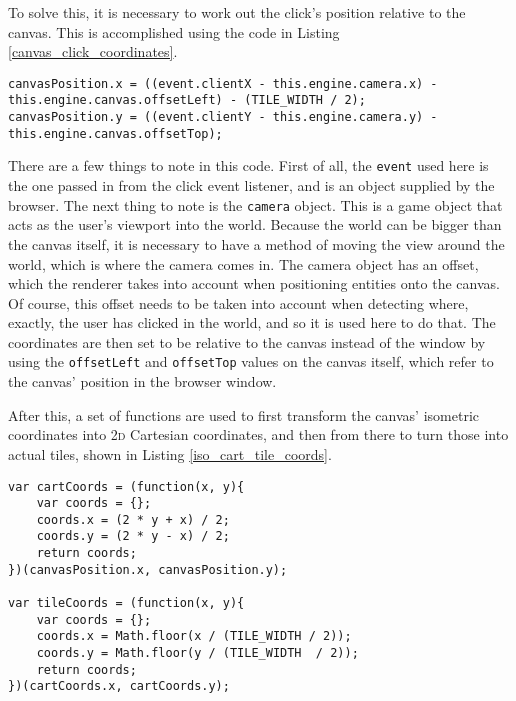 To solve this, it is necessary to work out the click's position relative to the canvas. This is accomplished using the code in Listing \ref{canvas_click_coordinates}.

\noindent
\begin{minipage}{\linewidth}
\begin{lstlisting}[style=js, caption={Transforming a user's click to be relative to the canvas, rather than the window.}, label=canvas_click_coordinates]
canvasPosition.x = ((event.clientX - this.engine.camera.x) - this.engine.canvas.offsetLeft) - (TILE_WIDTH / 2);
canvasPosition.y = ((event.clientY - this.engine.camera.y) - this.engine.canvas.offsetTop);
\end{lstlisting}
\end{minipage}

There are a few things to note in this code. First of all, the \texttt{event} used here is the one passed in from the click event listener, and is an object supplied by the browser. The next thing to note is the \texttt{camera} object. This is a game object that acts as the user's viewport into the world. Because the world can be bigger than the canvas itself, it is necessary to have a method of moving the view around the world, which is where the camera comes in. The camera object has an offset, which the renderer takes into account when positioning entities onto the canvas. Of course, this offset needs to be taken into account when detecting where, exactly, the user has clicked in the world, and so it is used here to do that. The coordinates are then set to be relative to the canvas instead of the window by using the \texttt{offsetLeft} and \texttt{offsetTop} values on the canvas itself, which refer to the canvas' position in the browser window.

After this, a set of functions are used to first transform the canvas' isometric coordinates into \textsc{2d} Cartesian coordinates, and then from there to turn those into actual tiles, shown in Listing \ref{iso_cart_tile_coords}.

\noindent
\begin{minipage}{\linewidth}
\begin{lstlisting}[style=js, caption={Turning the canvas isometric coordinates into \textsc{2d} Cartesian coordinates and then into tile positions. Original algorithm to transform isometric to Cartesian space from \cite{citeulike:13155325}.}, label=iso_cart_tile_coords]
var cartCoords = (function(x, y){
    var coords = {};
    coords.x = (2 * y + x) / 2;
    coords.y = (2 * y - x) / 2;
    return coords;
})(canvasPosition.x, canvasPosition.y);

var tileCoords = (function(x, y){
    var coords = {};
    coords.x = Math.floor(x / (TILE_WIDTH / 2));
    coords.y = Math.floor(y / (TILE_WIDTH  / 2));
    return coords;
})(cartCoords.x, cartCoords.y);
\end{lstlisting}
\end{minipage}

